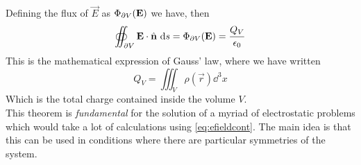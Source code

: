 \documentclass[../electromagnetism]{subfiles}
\begin{document}
Defining the flux of $\vec{E}$ as $\Phi_{\partial V}(\mathbf{E})$ we have, then
\begin{equation}
	\oiint_{\partial V}\mathbf{E}\cdot\hat{\mathbf{n}}\ \mathrm{d} s=\Phi_{\partial V}(\mathbf{E})=\frac{Q_V}{\epsilon_0}
	\label{eq:gausslaw}
\end{equation}
This is the mathematical expression of Gauss' law, where we have written
\begin{equation*}
	Q_V=\iiint_V\rho(\vec{r})\dd^3x
\end{equation*}
Which is the total charge contained inside the volume $V$.\\
This theorem is \textit{fundamental} for the solution of a myriad of electrostatic problems which would take a lot of calculations using \eqref{eq:efieldcont}. The main idea is that this can be used in conditions where there are particular symmetries of the system.
\end{document}

